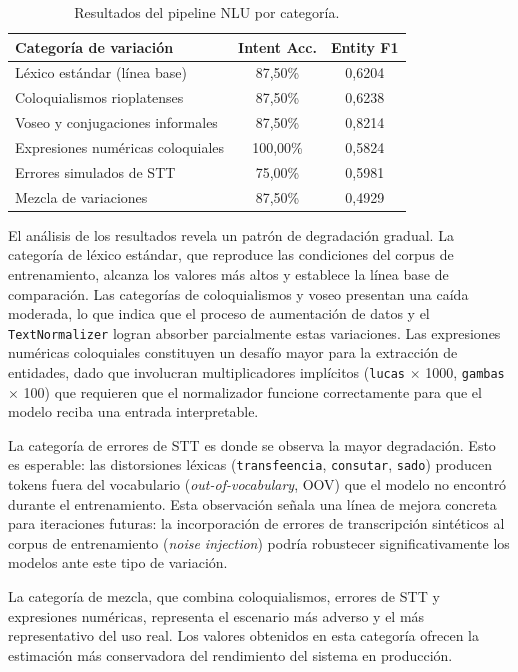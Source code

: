 \begin{table}[H]
\caption{Resultados del pipeline NLU por categoría.}
\centering
\begin{tabular}{@{}lcc@{}}
\toprule
\textbf{Categoría de variación}
  & \textbf{Intent Acc.}
  & \textbf{Entity F1} \\
\midrule
Léxico estándar (línea base)
  & 87,50\%
  & 0,6204 \\
Coloquialismos rioplatenses
  & 87,50\%
  & 0,6238 \\
Voseo y conjugaciones informales
  & 87,50\%
  & 0,8214 \\
Expresiones numéricas coloquiales
  & 100,00\%
  & 0,5824 \\
Errores simulados de STT
  & 75,00\%
  & 0,5981 \\
Mezcla de variaciones
  & 87,50\%
  & 0,4929 \\
\bottomrule
\end{tabular}
\label{tab:robustez}
\end{table}

El análisis de los resultados revela un patrón de degradación gradual. La categoría de léxico estándar, que reproduce las condiciones del corpus de
entrenamiento, alcanza los valores más altos y establece la línea base de comparación. Las categorías de coloquialismos y voseo presentan una caída
moderada, lo que indica que el proceso de aumentación de datos y el \texttt{TextNormalizer} logran absorber parcialmente estas variaciones. Las
expresiones numéricas coloquiales constituyen un desafío mayor para la extracción de entidades, dado que involucran multiplicadores implícitos
(\texttt{lucas} $\times$ 1000, \texttt{gambas} $\times$ 100) que requieren que el normalizador funcione correctamente para que el modelo reciba una entrada
interpretable.

La categoría de errores de STT es donde se observa la mayor degradación. Esto es esperable: las distorsiones léxicas (\texttt{transfeencia}, \texttt{consutar},
\texttt{sado}) producen tokens fuera del vocabulario (\textit{out-of-vocabulary}, OOV) que el modelo no encontró durante el entrenamiento. Esta observación
señala una línea de mejora concreta para iteraciones futuras: la incorporación de errores de transcripción sintéticos al corpus de entrenamiento
(\textit{noise injection}) podría robustecer significativamente los modelos ante este tipo de variación.

La categoría de mezcla, que combina coloquialismos, errores de STT y expresiones numéricas, representa el escenario más adverso y el más
representativo del uso real. Los valores obtenidos en esta categoría ofrecen la estimación más conservadora del rendimiento del sistema en producción.

